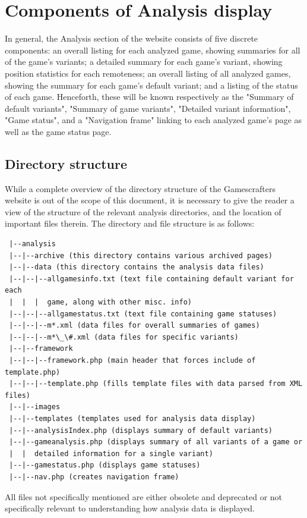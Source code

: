 \documentclass[11pt]{article}
\begin{document}
\section{Components of Analysis display}
In general, the Analysis section of the website consists of five discrete components: an overall listing for each analyzed game, showing summaries for all of the game's variants; a detailed summary for each game's variant, showing position statistics for each remoteness; an overall listing of all analyzed games, showing the summary for each game's default variant; and a listing of the status of each game. Henceforth, these will be known respectively as the "Summary of default variants", "Summary of game variants", "Detailed variant information", "Game status", and a "Navigation frame" linking to each analyzed game's page as well as the game status page.

\subsection{Directory structure}
While a complete overview of the directory structure of the Gamescrafters website is out of the scope of this document, it is necessary to give the reader a view of the structure of the relevant analysis directories, and the location of important files therein. The directory and file structure is as follows:
\begin{verbatim}
 |--analysis
 |--|--archive (this directory contains various archived pages)
 |--|--data (this directory contains the analysis data files)
 |--|--|--allgamesinfo.txt (text file containing default variant for each 
 |  |  |  game, along with other misc. info)
 |--|--|--allgamestatus.txt (text file containing game statuses)
 |--|--|--m*.xml (data files for overall summaries of games)
 |--|--|--m*\_\#.xml (data files for specific variants)
 |--|--framework
 |--|--|--framework.php (main header that forces include of template.php)
 |--|--|--template.php (fills template files with data parsed from XML files)
 |--|--images
 |--|--templates (templates used for analysis data display)
 |--|--analysisIndex.php (displays summary of default variants)
 |--|--gameanalysis.php (displays summary of all variants of a game or
 |  |  detailed information for a single variant)
 |--|--gamestatus.php (displays game statuses)
 |--|--nav.php (creates navigation frame)
\end{verbatim}
All files not specifically mentioned are either obsolete and deprecated or not specifically relevant to understanding how analysis data is displayed.
\end{document}
